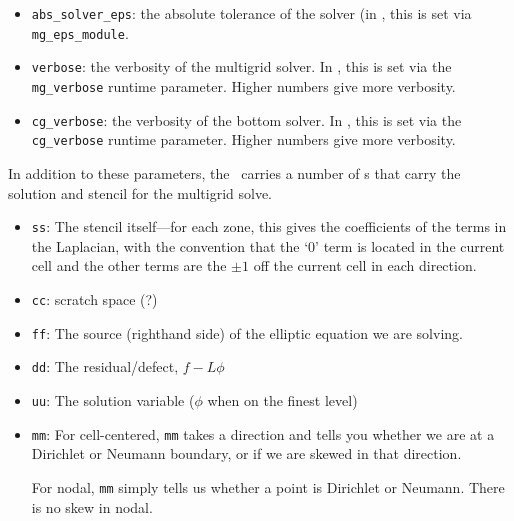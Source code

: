 \begin{itemize}
\item {\tt abs\_solver\_eps}: the absolute tolerance of the solver (in
  \maestro, this is set via {\tt mg\_eps\_module}.

\item {\tt verbose}: the verbosity of the multigrid solver.  In \maestro,
  this is set via the {\tt mg\_verbose} runtime parameter.  Higher
  numbers give more verbosity.

\item {\tt cg\_verbose}: the verbosity of the bottom solver.  In \maestro,
  this is set via the {\tt cg\_verbose} runtime parameter.  Higher
  numbers give more verbosity.

\end{itemize}

In addition to these parameters, the \mgtower\ carries a number of
\multifab s that carry the solution and stencil for the multigrid
solve.

\begin{itemize}

\item {\tt ss}: The stencil itself---for each zone, this gives the 
  coefficients of the terms in the Laplacian, with the convention that
  the `0' term is located in the current cell and the other terms are
  the $\pm 1$ off the current cell in each direction.

\item {\tt cc}: scratch space (?)

\item {\tt ff}: The source (righthand side) of the elliptic equation
  we are solving.

\item {\tt dd}: The residual/defect, $f - L\phi$

\item {\tt uu}: The solution variable ($\phi$ when on the finest level)

\item {\tt mm}: For cell-centered, {\tt mm} takes a direction and
   tells you whether we are at a Dirichlet or Neumann boundary, or if 
   we are skewed in that direction.

   For nodal, {\tt mm} simply tells us whether a point is Dirichlet
   or Neumann.  There is no skew in nodal.

\end{itemize}


\subsubsection{\bndryreg}

